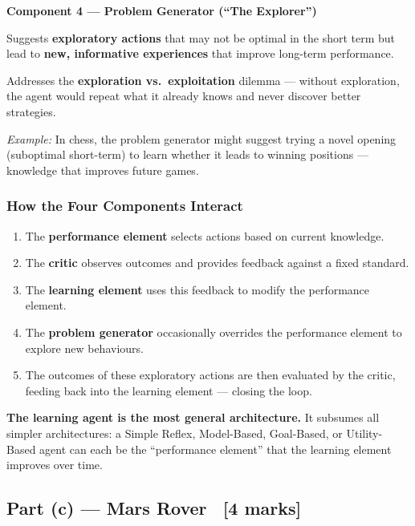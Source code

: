 \documentclass[12pt, a4paper]{article}
\newenvironment{answerbox}{\begin{mdframed}[style=answerframe]}{\end{mdframed}}
\begin{document}
\noindent\textbf{Component 4 — Problem Generator (``The Explorer'')}
\begin{keypoints}
  \item Suggests \textbf{exploratory actions} that may not be optimal in the short term but lead to \textbf{new, informative experiences} that improve long-term performance.
  \item Addresses the \textbf{exploration vs.\ exploitation} dilemma — without exploration, the agent would repeat what it already knows and never discover better strategies.
  \item \emph{Example:} In chess, the problem generator might suggest trying a novel opening (suboptimal short-term) to learn whether it leads to winning positions — knowledge that improves future games.
\end{keypoints}

\subsubsection*{How the Four Components Interact}

\begin{enumerate}[noitemsep, leftmargin=1.5cm]
  \item The \textbf{performance element} selects actions based on current knowledge.
  \item The \textbf{critic} observes outcomes and provides feedback against a fixed standard.
  \item The \textbf{learning element} uses this feedback to modify the performance element.
  \item The \textbf{problem generator} occasionally overrides the performance element to explore new behaviours.
  \item The outcomes of these exploratory actions are then evaluated by the critic, feeding back into the learning element — closing the loop.
\end{enumerate}

\begin{answerbox}
\textbf{The learning agent is the most general architecture.} It subsumes all simpler architectures: a Simple Reflex, Model-Based, Goal-Based, or Utility-Based agent can each be the ``performance element'' that the learning element improves over time.
\end{answerbox}

\subsection{Part (c) — Mars Rover \ [4 marks]}
\end{document}
